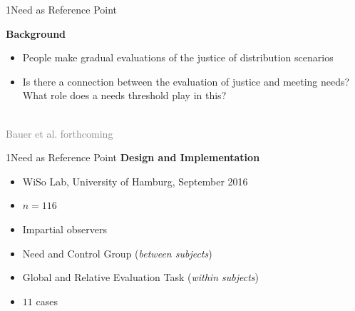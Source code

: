\documentclass[xcolor=table,9pt,aspectratio=169]{beamer}
\begin{document}
\begin{frame}{\vspace*{10mm}1\hspace*{1em}Need as Reference Point}
\begin{multicols}{2}
   \textbf{Background}\\
   \medskip
   \begin{itemize}
      \item People make gradual evaluations of the justice of distribution scenarios
      \item Is there a connection between the evaluation of justice and meeting needs? What role does a needs threshold play in this?
   \end{itemize}
   \vfill
   \begin{center}
      \\
      \textcolor{gray}{Bauer et al. forthcoming}
   \end{center}
\end{multicols}
\end{frame}


\begin{frame}{\vspace*{10mm}1\hspace*{1em}Need as Reference Point}
\textbf{Design and Implementation}\\
\medskip
\begin{itemize}
   \item WiSo Lab, University of Hamburg, September 2016
   \item $n=116$
   \item Impartial observers
   \item Need and Control Group (\textit{between subjects})
   \item Global and Relative Evaluation Task (\textit{within subjects})
   \item $11$ cases
\end{itemize}
\end{frame}
\end{document}
